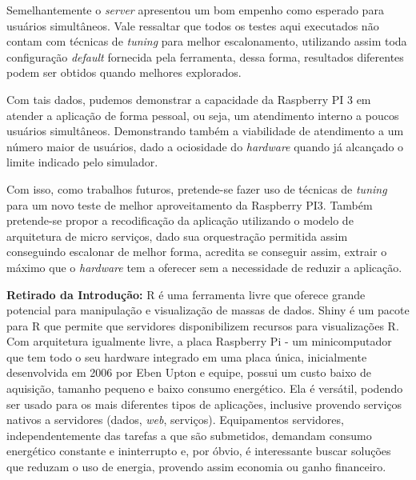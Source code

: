 \documentclass[12pt,english,brazil]{article}
\begin{document}
Semelhantemente o \emph{server} apresentou um bom empenho como esperado para usuários simultâneos. Vale ressaltar que todos os testes aqui executados não contam com técnicas de \emph{tuning} para melhor escalonamento, utilizando assim toda configuração \emph{default} fornecida pela ferramenta, dessa forma, resultados diferentes podem ser obtidos quando melhores explorados.

Com tais dados, pudemos demonstrar a capacidade da Raspberry PI 3 em atender a aplicação de forma pessoal, ou seja, um atendimento interno a poucos usuários simultâneos. Demonstrando também a viabilidade de atendimento a um número maior de usuários, dado a ociosidade do \emph{hardware} quando já alcançado o limite indicado pelo simulador.

Com isso, como trabalhos futuros, pretende-se fazer uso de técnicas de \emph{tuning} para um novo teste de melhor aproveitamento da Raspberry PI3. Também pretende-se propor a recodificação da aplicação utilizando o modelo de arquitetura de micro serviços, dado sua orquestração permitida assim conseguindo escalonar de melhor forma, acredita se conseguir assim, extrair o máximo que o \emph{hardware} tem a oferecer sem a necessidade de reduzir a aplicação. 





{\textbf{Retirado da Introdução:}
R é uma ferramenta livre que oferece grande potencial para manipulação e visualização de massas de dados. Shiny é um pacote para R que permite que servidores disponibilizem recursos para visualizações R. 
Com arquitetura igualmente livre, a placa Raspberry Pi - um minicomputador que tem todo o seu hardware integrado em uma placa única, inicialmente desenvolvida em 2006 por Eben Upton e equipe, %
possui um custo baixo de aquisição, tamanho pequeno e baixo consumo energético. Ela é versátil, podendo ser usado para os mais diferentes tipos de aplicações, inclusive provendo serviços nativos a servidores (dados, \emph{web}, serviços). 
Equipamentos servidores, independentemente das tarefas a que são submetidos, demandam consumo energético constante e ininterrupto e, por óbvio, é interessante buscar soluções que reduzam o uso de energia, provendo assim economia ou ganho financeiro. }
\end{document}
